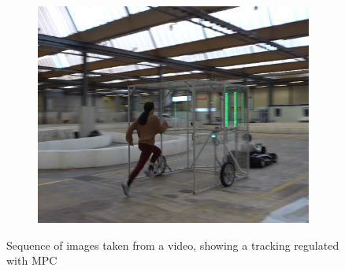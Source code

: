 \documentclass[a4paper,12pt,oneside]{book}
\begin{document}
\begin{figure}[h!]
\begin{subfigure}[b]{0.32\textwidth}
        \includegraphics[width=\textwidth]{SteadyState/ss9.png}
    \end{subfigure}
    \caption{Sequence of images taken from a video, showing a tracking regulated with MPC }
\label{MPC_hard_img2}
\end{figure}
\end{document}
